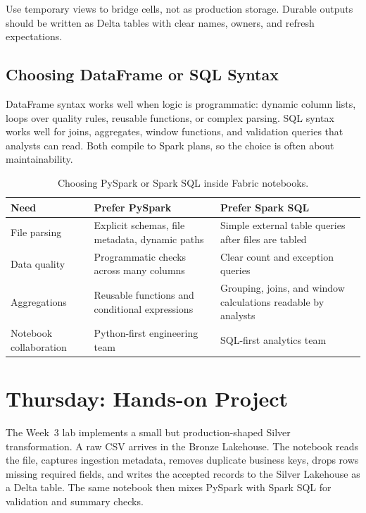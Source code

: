 \begin{notebox}
Use temporary views to bridge cells, not as production storage. Durable outputs should be written as Delta tables with clear names, owners, and refresh expectations.
\end{notebox}

\subsection{Choosing DataFrame or SQL Syntax}
DataFrame syntax works well when logic is programmatic: dynamic column lists, loops over quality rules, reusable functions, or complex parsing. SQL syntax works well for joins, aggregates, window functions, and validation queries that analysts can read. Both compile to Spark plans, so the choice is often about maintainability.

\begin{table}[H]
\centering
\small
\begin{tabular}{@{}p{3.3cm}p{4.8cm}p{4.8cm}@{}}
\toprule
\textbf{Need} & \textbf{Prefer PySpark} & \textbf{Prefer Spark SQL} \\
\midrule
File parsing & Explicit schemas, file metadata, dynamic paths & Simple external table queries after files are tabled \\
Data quality & Programmatic checks across many columns & Clear count and exception queries \\
Aggregations & Reusable functions and conditional expressions & Grouping, joins, and window calculations readable by analysts \\
Notebook collaboration & Python-first engineering team & SQL-first analytics team \\
\bottomrule
\end{tabular}
\caption{Choosing PySpark or Spark SQL inside Fabric notebooks.}
\label{tab:chapter3-pyspark-sql-choice}
\end{table}

\section{Thursday: Hands-on Project}
The Week~3 lab implements a small but production-shaped Silver transformation. A raw CSV arrives in the Bronze Lakehouse. The notebook reads the file, captures ingestion metadata, removes duplicate business keys, drops rows missing required fields, and writes the accepted records to the Silver Lakehouse as a Delta table. The same notebook then mixes PySpark with Spark SQL for validation and summary checks.


